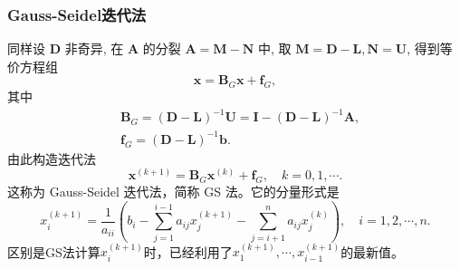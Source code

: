 \subsubsection{Gauss-Seidel迭代法}
同样设 $\boldsymbol{D}$ 非奇异, 在 $\boldsymbol{A}$ 的分裂 $\boldsymbol{A}=\boldsymbol{M}-\boldsymbol{N}$ 中, 取 $\boldsymbol{M}=\boldsymbol{D - L}, \boldsymbol{N}=\boldsymbol{U}$, 得到等价方程组
$$
    \boldsymbol{x}=\boldsymbol{B}_G \boldsymbol{x}+\boldsymbol{f}_G,
$$
其中
$$
    \begin{aligned}
         & \boldsymbol{B}_G=(\boldsymbol{D}-\boldsymbol{L})^{-1} \boldsymbol{U}=\boldsymbol{I}-(\boldsymbol{D}-\boldsymbol{L})^{-1} \boldsymbol{A}, \\
         & \boldsymbol{f}_G=(\boldsymbol{D}-\boldsymbol{L})^{-1} \boldsymbol{b} .
    \end{aligned}
$$
由此构造迭代法
$$
    \boldsymbol{x}^{(k+1)}=\boldsymbol{B}_G \boldsymbol{x}^{(k)}+\boldsymbol{f}_G, \quad k=0,1, \cdots .
$$
这称为 Gauss-Seidel 迭代法，简称 GS 法。它的分量形式是
\begin{equation}\label{eq:gs_iterative_formula_component}
    x_i^{(k+1)}=\frac{1}{a_{i i}}\left(b_i-\sum_{j=1}^{i-1} a_{i j} x_j^{(k+1)}-\sum_{j=i+1}^n a_{i j} x_j^{(k)}\right), \quad i=1,2, \cdots, n .
\end{equation}
区别是GS法计算$x_i^{(k+1)}$时，已经利用了$x_1^{(k+1)},\cdots,x_{i-1}^{(k+1)}$的最新值。

